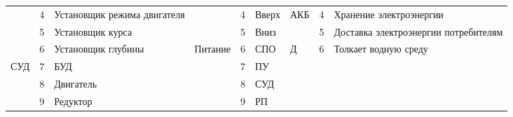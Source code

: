 \begin{landscape}
\begin{longtable}[c]{llm{}||l|l|m{}||llm{}}
\multicolumn{1}{|l|}{}                     & \multicolumn{1}{l|}{4}          & Установщик режима двигателя                 &                                   & 4                               & Вверх                            & \multicolumn{1}{l|}{\multirow{2}{*}{АКБ}} & \multicolumn{1}{l|}{4}          & \multicolumn{1}{l|}{Хранение электроэнергии}              \\ \cline{2-3} \cline{5-6} \cline{8-9} 
\multicolumn{1}{|l|}{}                     & \multicolumn{1}{l|}{5}          & Установщик курса                            &                                   & 5                               & Вниз                             & \multicolumn{1}{l|}{}                     & \multicolumn{1}{l|}{5}          & \multicolumn{1}{p{.25\textwidth}|}{Доставка электроэнергии потребителям} \\ \cline{2-9} 
\multicolumn{1}{|l|}{}                     & \multicolumn{1}{l|}{6}          & Установщик глубины                          & \multirow{5}{*}{Питание}          & 6                               & СПО                              & \multicolumn{1}{l|}{Д}                    & \multicolumn{1}{l|}{6}          & \multicolumn{1}{l|}{Толкает водную среду}                 \\ \cline{1-3} \cline{5-9} 
\multicolumn{1}{|l|}{\multirow{3}{*}{СУД}} & \multicolumn{1}{l|}{7}          & БУД                                         &                                   & 7                               & ПУ                               &                                           &                                 &                                                           \\ \cline{2-3} \cline{5-6}
\multicolumn{1}{|l|}{}                     & \multicolumn{1}{l|}{8}          & Двигатель                                   &                                   & 8                               & СУД                              &                                           &                                 &                                                           \\ \cline{2-3} \cline{5-6}
\multicolumn{1}{|l|}{}                     & \multicolumn{1}{l|}{9}          & Редуктор                                    &                                   & 9                               & РП                               &                                           &                                 &                                                           \\ \cline{1-3} \cline{5-6}

\end{longtable}
\end{landscape}
